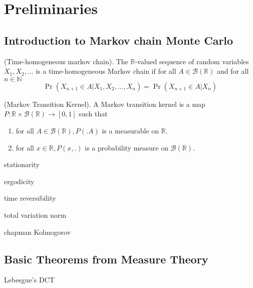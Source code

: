 \chapter{Preliminaries}
\section{Introduction to Markov chain Monte Carlo}
\begin{definition}
	(Time-homogeneous markov chain). The $\mathbb{R}$-valued sequence of random variables $X_1, X_2, \dots$ is a time-homogeneous Markov chain if for all $A \in \mathcal{B}(\mathbb{R})$ and for all $n \in \mathbb{N}$
	$$\Pr(X_{n+1} \in A | X_1, X_2, \dots, X_n) = \Pr(X_{n+1} \in A | X_n)$$
\end{definition}
\begin{definition}
	(Markov Transition Kernel). A Markov transition kernel is a map $P: \mathbb{R} \times \mathcal{B}(\mathbb{R}) \rightarrow [0, 1]$ such that
	\begin{enumerate}
		\item for all $A \in \mathcal{B}(\mathbb{R}), P(. A)$ is a measurable on $\mathbb{R}$.
		\item for all $x \in \mathbb{R}, P(x, .)$ is a probability measure on $\mathcal{B}(\mathbb{R})$.
	\end{enumerate}
\end{definition}
\begin{definition}
	stationarity
\end{definition}
\begin{definition}
	ergodicity
\end{definition}
\begin{definition}
	time reversibility
\end{definition}
\begin{definition}
	total variation norm
\end{definition}
\begin{definition}
	chapman Kolmogorov
\end{definition}

\section{Basic Theorems from Measure Theory}
\begin{theorem}
	Lebesgue's DCT
\end{theorem}
